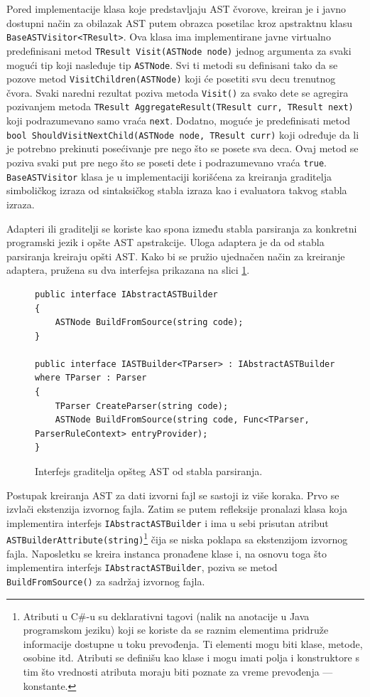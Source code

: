 Pored implementacije klasa koje predstavljaju AST čvorove, kreiran je i javno dostupni način za obilazak AST putem obrazca posetilac kroz apstraktnu klasu \texttt{BaseASTVisitor<TResult>}. Ova klasa ima implementirane javne virtualno predefinisani metod \texttt{TResult Visit(ASTNode node)} jednog argumenta za svaki mogući tip koji nasleđuje tip \texttt{ASTNode}. Svi ti metodi su definisani tako da se pozove metod \texttt{VisitChildren(ASTNode)} koji će posetiti svu decu trenutnog čvora. Svaki naredni rezultat poziva metoda \texttt{Visit()} za svako dete se agregira pozivanjem metoda \texttt{TResult AggregateResult(TResult curr, TResult next)} koji podrazumevano samo vraća \texttt{next}. Dodatno, moguće je predefinisati metod \texttt{bool ShouldVisitNextChild(ASTNode node, TResult curr)} koji određuje da li je potrebno prekinuti posećivanje pre nego što se posete sva deca. Ovaj metod se poziva svaki put pre nego što se poseti dete i podrazumevano vraća \texttt{true}. \texttt{BaseASTVisitor} klasa je u implementaciji korišćena za kreiranja graditelja simboličkog izraza od sintaksičkog stabla izraza kao i evaluatora takvog stabla izraza. 

Adapteri ili graditelji se koriste kao spona između stabla parsiranja za konkretni programski jezik i opšte AST apstrakcije. Uloga adaptera je da od stabla parsiranja kreiraju opšti AST. Kako bi se pružio ujednačen način za kreiranje adaptera, pružena su dva interfejsa prikazana na slici \ref{fig:ImplBuilderInterface}.

\begin{figure}[h!]
\centering
\begin{lstlisting}
public interface IAbstractASTBuilder
{
    ASTNode BuildFromSource(string code);
}

public interface IASTBuilder<TParser> : IAbstractASTBuilder where TParser : Parser
{
    TParser CreateParser(string code);
    ASTNode BuildFromSource(string code, Func<TParser, ParserRuleContext> entryProvider);
}
\end{lstlisting}
\caption{Interfejs graditelja opšteg AST od stabla parsiranja.}
\label{fig:ImplBuilderInterface}
\end{figure}

Postupak kreiranja AST za dati izvorni fajl se sastoji iz više koraka. Prvo se izvlači ekstenzija izvornog fajla. Zatim se putem refleksije pronalazi klasa koja implementira interfejs \texttt{IAbstractASTBuilder} i ima u sebi prisutan atribut \texttt{ASTBuilderAttribute(string)}\footnote{Atributi u C\#-u su deklarativni tagovi (nalik na anotacije u Java programskom jeziku) koji se koriste da se raznim elementima pridruže informacije dostupne u toku prevođenja. Ti elementi mogu biti klase, metode, osobine itd. Atributi se definišu kao klase i mogu imati polja i konstruktore s tim što vrednosti atributa moraju biti poznate za vreme prevođenja --- konstante.}
čija se niska poklapa sa ekstenzijom izvornog fajla. Naposletku se kreira instanca pronađene klase i, na osnovu toga što implementira interfejs \texttt{IAbstractASTBuilder}, poziva se metod \texttt{BuildFromSource()} za sadržaj izvornog fajla.

